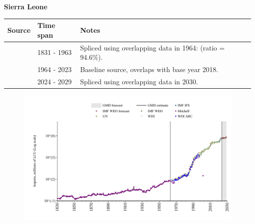 \documentclass[12pt,a4paper,landscape]{article}
\begin{document}
\begin{adjustbox}{max totalsize={\paperwidth}{\paperheight},center}
\begin{minipage}[t][\textheight][t]{\textwidth}
\vspace*{0.5cm}
{}
\begin{center}
{\Large\bfseries Sierra Leone}
\end{center}
\vspace{0.5cm}
\begin{table}[H]
\centering
\small
\begin{tabular}{|l|l|l|}
\hline
\textbf{Source} & \textbf{Time span} & \textbf{Notes} \\
\hline
\rowcolor{white}\cite{Mitchell}& 1831 - 1963 &Spliced using overlapping data in 1964: (ratio = 94.6\%).\\
\rowcolor{lightgray}\cite{WDI}& 1964 - 2023 &Baseline source, overlaps with base year 2018.\\
\rowcolor{white}\cite{IMF_WEO_forecast}& 2024 - 2029 &Spliced using overlapping data in 2030.\\
\hline
\end{tabular}
\end{table}
\begin{figure}[H]
\centering
\includegraphics[width=\textwidth,height=0.6\textheight,keepaspectratio]{graphs/SLE_imports.pdf}
\end{figure}
\end{minipage}
\end{adjustbox}
\end{document}
